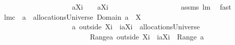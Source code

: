 \begin{isabellebody}
\ \ \ \ \ \ \ \ \ \ \ \ \ \ \ \ \ \ \ \ {\isachardoublequoteopen}{\isacharbraceleft}{\isasymUnion}{\isacharparenleft}a{\isacharbackquote}{\isacharbackquote}{\isacharparenleft}X{\isasymunion}{\isacharbraceleft}i{\isacharbraceright}{\isacharparenright}{\isacharparenright}{\isacharbraceright}{\isacharminus}{\isacharbraceleft}{\isacharbraceleft}{\isacharbraceright}{\isacharbraceright}\ \ {\isacharequal}\ \ {\isacharbraceleft}{\isasymUnion}{\isacharparenleft}a{\isacharbackquote}{\isacharbackquote}{\isacharparenleft}X{\isasymunion}{\isacharbraceleft}i{\isacharbraceright}{\isacharparenright}{\isacharparenright}{\isacharbraceright}{\isachardoublequoteclose}\ \isanewline
%
\isadelimproof
\ \ \ \ \ \ \ \ \ \ \ \ \ \ \ \ \ %
\endisadelimproof
%
\isatagproof
{}\isamarkupfalse%
\ assms\ lm{}{}\ \isamarkupfalse%
\ fast%
\endisatagproof
{\isafoldproof}%
%
\isadelimproof
\isanewline
%
\endisadelimproof
\isanewline
\isanewline
{}\isamarkupfalse%
\ lm{}{}c{\isacharcolon}\ \ {\isachardoublequoteopen}a\ {\isasymin}\ allocationsUniverse{\isachardoublequoteclose}\ {\isachardoublequoteopen}{\isacharparenleft}Domain\ a{\isacharparenright}\ {\isasyminter}\ X\ {\isasymnoteq}\ {\isacharbraceleft}{\isacharbraceright}{\isachardoublequoteclose}\ \isanewline
\ \ \ \ \ \ \ \ \ \ \ \ \ \ \ \ \ \ \ \ {\isachardoublequoteopen}{\isacharparenleft}a\ outside\ {\isacharparenleft}X{\isasymunion}{\isacharbraceleft}i{\isacharbraceright}{\isacharparenright}{\isacharparenright}\ {\isasymunion}\ {\isacharparenleft}{\isacharbraceleft}i{\isacharbraceright}{\isasymtimes}{\isacharbraceleft}{\isasymUnion}{\isacharparenleft}a{\isacharbackquote}{\isacharbackquote}{\isacharparenleft}X{\isasymunion}{\isacharbraceleft}i{\isacharbraceright}{\isacharparenright}{\isacharparenright}{\isacharbraceright}{\isacharparenright}\ {\isasymin}\ allocationsUniverse\ {\isacharampersand}\ \isanewline
\ \ \ \ \ \ \ \ \ \ \ \ \ \ \ \ \ \ \ \ \ \ \ \ \ {\isasymUnion}{\isacharparenleft}Range{\isacharparenleft}{\isacharparenleft}a\ outside\ {\isacharparenleft}X{\isasymunion}{\isacharbraceleft}i{\isacharbraceright}{\isacharparenright}{\isacharparenright}\ {\isasymunion}\ {\isacharparenleft}{\isacharbraceleft}i{\isacharbraceright}{\isasymtimes}{\isacharbraceleft}{\isasymUnion}{\isacharparenleft}a{\isacharbackquote}{\isacharbackquote}{\isacharparenleft}X{\isasymunion}{\isacharbraceleft}i{\isacharbraceright}{\isacharparenright}{\isacharparenright}{\isacharbraceright}{\isacharparenright}{\isacharparenright}{\isacharparenright}\ {\isacharequal}\ {\isasymUnion}{\isacharparenleft}Range\ a{\isacharparenright}{\isachardoublequoteclose}\isanewline

\end{isabellebody}
